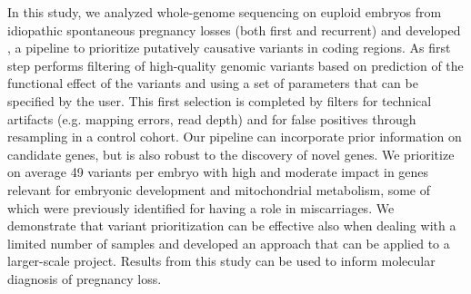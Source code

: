 In this study, we analyzed whole-genome sequencing on euploid embryos from idiopathic spontaneous pregnancy losses (both first and recurrent) and developed \gp, a pipeline to prioritize putatively causative variants in coding regions. As first step \gp performs filtering of high-quality genomic variants based on prediction of the functional effect of the variants and using a set of parameters that can be specified by the user. This first selection is completed by filters for technical artifacts (e.g. mapping errors, read depth) and for false positives through resampling in a control cohort. Our pipeline can incorporate prior information on candidate genes, but is also robust to the discovery of novel genes.  %
We prioritize on average 49 variants per embryo with high and moderate impact in genes relevant for embryonic development and mitochondrial metabolism, some of which were previously identified for having a role in miscarriages. We demonstrate that variant prioritization can be effective also when dealing with a limited number of samples and developed an approach that can be applied to a larger-scale project. Results from this study can be used to inform molecular diagnosis of pregnancy loss. 






